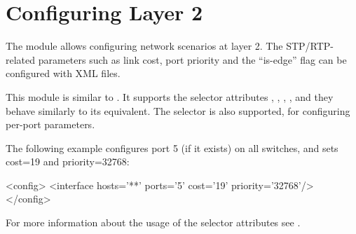 

\section{Configuring Layer 2}
\label{sec:autoconfig:configuring-layer-2}

The  module allows configuring network scenarios at layer 2.
The STP/RTP-related parameters such as link cost, port priority
and the ``is-edge'' flag can be configured with XML files.

This module is similar to . It supports
the selector attributes , , , ,
and they behave similarly to its  equivalent.
The  selector is also supported, for configuring per-port parameters.

The following example configures port 5 (if it exists) on all switches,
and sets cost=19 and priority=32768:

\begin{XML}
<config>
  <interface hosts='**' ports='5' cost='19' priority='32768'/>
</config>
\end{XML}

For more information about the usage of the selector attributes see
.




